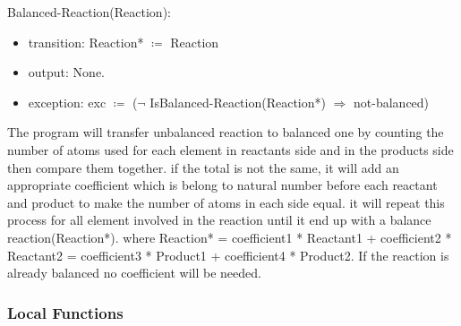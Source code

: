 \documentclass[12pt, titlepage]{article}
\begin{document}
\noindent Balanced-Reaction(Reaction):
\begin{itemize}
\item transition: Reaction* $\coloneqq$  Reaction 
\item output: None. 
\item exception: exc $\coloneqq$  ($\neg$ IsBalanced-Reaction(Reaction*) $\Rightarrow$ not-balanced)
\end{itemize}

The program will transfer unbalanced reaction to balanced one by counting the number of atoms used for each element in reactants side and in the products side then compare them together. if the total is not the same, it will add an appropriate coefficient which is belong to natural number before each reactant and product to make the number of atoms in each side equal. it will repeat this process for all element involved in the reaction until it end up with a balance reaction(Reaction*). where Reaction* = coefficient1 * Reactant1 + coefficient2 * Reactant2 = coefficient3 * Product1 + coefficient4 * Product2. If the reaction is already balanced no coefficient will be needed. 

\subsubsection{Local Functions}
\end{document}
